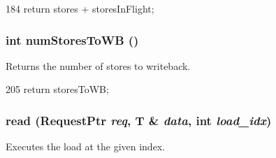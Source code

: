 \begin{DoxyCode}
184 { return stores + storesInFlight; }
\end{DoxyCode}
\hypertarget{classOzoneLWLSQ_a276cdbdaf4551f1b846c4e2535c5f882}{
\subsubsection[{numStoresToWB}]{\setlength{\rightskip}{0pt plus 5cm}int numStoresToWB ()}}
\label{classOzoneLWLSQ_a276cdbdaf4551f1b846c4e2535c5f882}
Returns the number of stores to writeback. 


\begin{DoxyCode}
205 { return storesToWB; }
\end{DoxyCode}
\hypertarget{classOzoneLWLSQ_a0747777ac998dabdc20fa0c554d378d3}{
\subsubsection[{read}]{ read ({\bf RequestPtr} {\em req}, \/  T \& {\em data}, \/  int {\em load\_\-idx})}}
\label{classOzoneLWLSQ_a0747777ac998dabdc20fa0c554d378d3}
Executes the load at the given index. 


